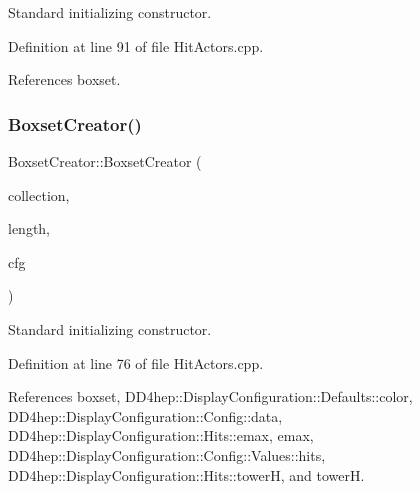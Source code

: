 Standard initializing constructor. 



Definition at line 91 of file Hit\+Actors.\+cpp.



References boxset.

\hypertarget{struct_d_d4hep_1_1_boxset_creator_a8fd3750929d22eb789720db97194c48e}{}\label{struct_d_d4hep_1_1_boxset_creator_a8fd3750929d22eb789720db97194c48e} 
\subsubsection{\texorpdfstring{Boxset\+Creator()}{BoxsetCreator()}\hspace{0.1cm}{\footnotesize\ttfamily [2/2]}}
{\footnotesize\ttfamily Boxset\+Creator\+::\+Boxset\+Creator (\begin{DoxyParamCaption}\item[{const std\+::string \&}]{collection,  }\item[{size\+\_\+t}]{length,  }\item[{const \hyperlink{class_d_d4hep_1_1_display_configuration_1_1_config}{Display\+Configuration\+::\+Config} \&}]{cfg }\end{DoxyParamCaption})}



Standard initializing constructor. 



Definition at line 76 of file Hit\+Actors.\+cpp.



References boxset, D\+D4hep\+::\+Display\+Configuration\+::\+Defaults\+::color, D\+D4hep\+::\+Display\+Configuration\+::\+Config\+::data, D\+D4hep\+::\+Display\+Configuration\+::\+Hits\+::emax, emax, D\+D4hep\+::\+Display\+Configuration\+::\+Config\+::\+Values\+::hits, D\+D4hep\+::\+Display\+Configuration\+::\+Hits\+::towerH, and towerH.

\hypertarget{struct_d_d4hep_1_1_boxset_creator_a244124a28255dd2e0533a64ce7ee1b56}{}\label{struct_d_d4hep_1_1_boxset_creator_a244124a28255dd2e0533a64ce7ee1b56} 
